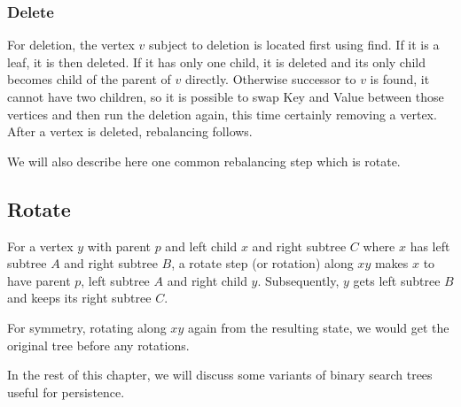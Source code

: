 \subsubsection*{Delete}
For deletion, the vertex $v$ subject to deletion is located first using find. If it is a leaf, it is then deleted. If it has only one child, it is deleted and its only child becomes child of the parent of $v$ directly. Otherwise successor to $v$ is found, it cannot have two children, so it is possible to swap Key and Value between those vertices and then run the deletion again, this time certainly removing a vertex. After a vertex is deleted, rebalancing follows.


We will also describe here one common rebalancing step which is rotate.

\subsection*{Rotate}

For a vertex $y$ with parent $p$ and left child $x$ and right subtree $C$ where $x$ has left subtree $A$ and right subtree $B$, a rotate step (or rotation) along $xy$ makes $x$ to have parent $p$, left subtree $A$ and right child $y$. Subsequently, $y$ gets left subtree $B$ and keeps its right subtree $C$.

For symmetry, rotating along $xy$ again from the resulting state, we would get the original tree before any rotations.



In the rest of this chapter, we will discuss some variants of binary search trees useful for persistence.